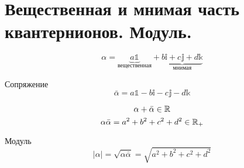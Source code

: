 \section{Вещественная и мнимая часть квантернионов. Модуль.}

$$\alpha=\underbrace{a\mathbb{1}}_{\text{вещественная}}+\underbrace{b\mathbb{i}+c\mathbb{j}+d\mathbb{k}}_{\text{мнимая}}$$
\begin{Def}
Сопряжение
$$\bar\alpha=a\mathbb{1}-b\mathbb{i}-c\mathbb{j}-d\mathbb{k}$$
\end{Def}
$$\alpha + \bar\alpha \in \mathbb{R}$$
$$\alpha\bar\alpha = a^2 + b^2 + c^2 + d^2 \in \mathbb{R}_+$$

\begin{Def}
Модуль
$$|\alpha| = \sqrt{\alpha \bar\alpha} = \sqrt{a^2 + b^2 + c^2 + d^2}$$
\end{Def}